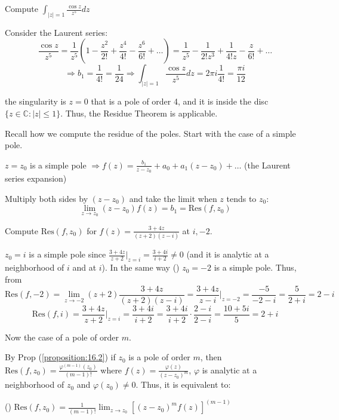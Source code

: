 \begin{example}\label{example:21.1}
    
   Compute $\int_{|z|=1} \frac{\cos z}{z^5} dz$
\end{example}
\begin{soln}
   Consider the Laurent series:
    \[
        \frac{\cos z}{z^5} = \frac{1}{z^5} \left( 1 - \frac{z^2}{2!} + \frac{z^4}{4!} - \frac{z^6}{6!} + \dots \right) = \frac{1}{z^5} - \frac{1}{2! z^3} + \frac{1}{4! z} - \frac{z}{6!} + \dots
        \]
        \[
            \Rightarrow b_1 = \frac{1}{4!} = \frac{1}{24} \Rightarrow \int_{|z|=1} \frac{\cos z}{z^5} dz = 2\pi i \frac{1}{4!} = \frac{\pi i}{12}
            \]
            
        \end{soln}

     the singularity is $z=0$ that is a pole of order 4, and it is inside the disc $\{z \in \mathbb{C}: |z| \le 1\}$. Thus, the Residue Theorem is applicable.
    

Recall how we compute the residue of the poles. Start with the case of a simple pole.

$z=z_0$ is a simple pole $\Rightarrow f(z) = \frac{b_1}{z-z_0} + a_0 + a_1 (z-z_0) + \dots$ (the Laurent series expansion)

Multiply both sides by $(z-z_0)$ and take the limit when $z$ tends to $z_0$:
\[
\lim_{z \to z_0} (z-z_0) f(z) = b_1 = \text{Res}(f, z_0)
\]


\begin{example}\label{example:21.2}Compute $\text{Res}(f, z_0)$ for $f(z) = \frac{3+4z}{(z+2)(z-i)}$ at $i, -2$.
\end{example}

\begin{soln}
    
    $z_0 = i$ is a simple pole since $\frac{3+4z}{z+2}|_{z=i} = \frac{3+4i}{i+2} \neq 0$ (and it is analytic at a neighborhood of $i$ and at $i$). In the same way (\verifythis) $z_0 = -2$ is a simple pole. Thus, from
    \[
        \text{Res}(f, -2) = \lim_{z \to -2} (z+2) \frac{3+4z}{(z+2)(z-i)} = \frac{3+4z}{z-i}|_{z=-2} = \frac{-5}{-2-i} = \frac{5}{2+i} = 2-i
        \]
        \[
            \text{Res}(f, i) = \frac{3+4z}{z+2}|_{z=i} = \frac{3+4i}{i+2} = \frac{3+4i}{i+2} \cdot \frac{2-i}{2-i} = \frac{10+5i}{5} = 2+i
            \]
            
            Now the case of a pole of order $m$.
            
            By Prop (\ref{proposition:16.2}) if $z_0$ is a pole of order $m$, then $\text{Res}(f, z_0) = \frac{\varphi^{(m-1)}(z_0)}{(m-1)!}$ where $f(z) = \frac{\varphi(z)}{(z-z_0)^m}$, $\varphi$ is analytic at a neighborhood of $z_0$ and $\varphi(z_0) \neq 0$. Thus, it is equivalent to:
            
            (\verifythis) $\text{Res}(f, z_0) = \frac{1}{(m-1)!} \lim_{z \to z_0} \left[ (z-z_0)^m f(z) \right]^{(m-1)}$
        \end{soln}

